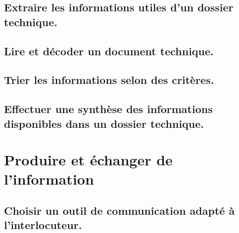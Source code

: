 \documentclass[10pt,fleqn]{article}
\begin{document}
\subsection{Extraire les informations utiles d’un dossier technique.} 

\begin{multicols}{2} 

\end{multicols}

\subsection{Lire et décoder un document technique.} 

\begin{multicols}{2} 

\end{multicols}

\subsection{Trier les informations selon des critères.} 

\begin{multicols}{2} 

\end{multicols}

\subsection{Effectuer une synthèse des informations disponibles dans un dossier technique.} 

\begin{multicols}{2} 

\end{multicols}

\section{Produire et échanger de l'information} 

\subsection{Choisir un outil de communication adapté à l’interlocuteur.} 

\begin{multicols}{2} 

\end{multicols}
\end{document}
